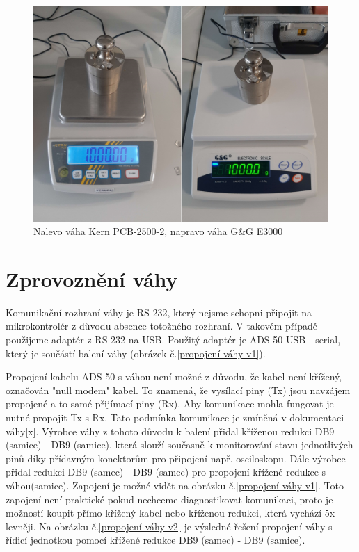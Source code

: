\begin{figure}[H]
    \begin{center}
        \includegraphics[scale=0.1]{obrazky/vahy.jpg}
    \end{center}
    \caption{Nalevo váha Kern PCB-2500-2, napravo váha G\&G E3000}
    \label{obr:váhy_porovnani}
\end{figure}

\section{Zprovoznění váhy}

Komunikační rozhraní váhy je RS-232, který nejsme schopni připojit na mikrokontrolér z důvodu absence totožného rozhraní. V takovém případě použijeme adaptér z RS-232 na USB. Použitý adaptér je ADS-50 USB - serial, který je součástí balení váhy (obrázek č.\ref{propojení váhy v1}).


Propojení kabelu ADS-50 s váhou není možné z důvodu, že kabel není křížený, označován "null modem" kabel. To znamená, že vysílací piny (Tx) jsou navzájem propojené a to samé přijímací piny (Rx). Aby komunikace mohla fungovat je nutné propojit Tx s Rx. Tato podmínka komunikace je zmíněná v dokumentaci váhy[x]. Výrobce váhy z tohoto důvodu k balení přidal kříženou redukci DB9 (samice) - DB9 (samice), která slouží současně k monitorování stavu jednotlivých pinů díky přídavným konektorům pro připojení např. osciloskopu. Dále výrobce přidal redukci DB9 (samec) - DB9 (samec) pro propojení křížené redukce s váhou(samice). Zapojení je možné vidět na obrázku č.\ref{propojení váhy v1}. Toto zapojení není praktické pokud nechceme diagnostikovat komunikaci, proto je možností koupit přímo křížený kabel nebo kříženou redukci, která vychází 5x levněji. Na obrázku č.\ref{propojení váhy v2} je výsledné řešení propojení váhy s řídicí jednotkou pomocí křížené redukce DB9 (samec) - DB9 (samice).

